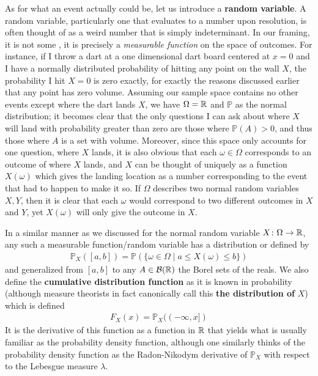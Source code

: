\documentclass[11pt]{article}
\begin{document}
As for what an event actually could be, let us introduce a \textbf{random variable}. A random variable, particularly one that evaluates to a number upon resolution, is often thought of as a weird number that is simply indeterminant. In our framing, it is not some , it is precisely a \emph{measurable function} on the space of outcomes. For instance, if I throw a dart at a one dimensional dart board centered at $x=0$ and I have a normally distributed probability of hitting any point on the wall $X$, the probability I hit $X =0$ is zero exactly, for exactly the reasons discussed earlier that any point has zero volume. Assuming our sample space contains no other events except where the dart lands $X$, we have $\Omega = \mathbb{R}$ and $\mathbb{P}$ as the normal distribution; it becomes clear that the only questions I can ask about where $X$ will land with probability greater than zero are those where $\mathbb{P}(A) > 0$, and thus those where $A$ is a set with volume. Moreover, since this space only accounts for one question, where $X$ lands, it is also obvious that each $\omega \in \Omega$ corresponds to an outcome of where $X$ lands, and $X$ can be thought of uniquely as a function $X(\omega)$ which gives the landing location as a number corresponding to the event that had to happen to make it so. If $\Omega$ describes two normal random variables $X,Y$, then it is clear that each $\omega$ would correspond to two different outcomes in $X$ and $Y$, yet $X(\omega)$ will only give the outcome in $X$.

In a similar manner as we discussed for the normal random variable $X\colon \Omega \to \mathbb{R}$, any such a measurable function/random variable has a distribution or  defined by \begin{gather*}
\mathbb{P}_X([a,b]) = \mathbb{P}(\{\omega \in \Omega \mid a \le X(\omega) \le b\})
\end{gather*} 
and generalized from $[a,b]$ to any $A \in \mathcal {B}(\mathbb{R})$ the Borel sets of the reals. We also define the \textbf{cumulative distribution function} as it is known in probability (although measure theorists in fact canonically call this \textbf{the distribution of }$X$) which is defined \begin{gather*}
F_X(x) = \mathbb{P}_X((-\infty, x])
\end{gather*}
It is the derivative of this function as a function in $\mathbb{R}$ that yields what is usually familiar as the probability density function, although one similarly thinks of the probability density function as the Radon-Nikodym derivative of $\mathbb{P}_X$ with respect to the Lebesgue measure $\lambda$.
\end{document}
